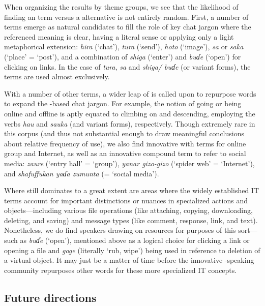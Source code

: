 \documentclass[output=paper
,newtxmath
,modfonts
,nonflat]{langsci/langscibook}
\begin{document}
When organizing the results by theme groups, we see that the likelihood of finding an  term versus a  alternative is not entirely random. First, a number of  terms emerge as natural candidates to fill the role of key chat jargon where the referenced meaning is clear, having a literal sense or applying only a light metaphorical extension: \textit{hira} (‘chat’), \textit{tura} (‘send’), \textit{hoto} (‘image’), \textit{sa} or \textit{saka} (‘place’ = ‘post’), and a combination of \textit{shiga} (‘enter’) and \textit{buɗe} (‘open’) for clicking on links. In the case of \textit{tura}, \textit{sa} and \textit{shiga/ buɗe} (or variant forms), the  terms are used almost exclusively. 

With a number of other terms, a wider leap of  is called upon to repurpose  words to expand the -based chat jargon. For example, the notion of going or being online and offline is aptly equated to climbing on and descending, employing the  verbs \textit{hau} and \textit{sauka} (and variant forms), respectively. Though extremely rare in this corpus (and thus not substantial enough to draw meaningful conclusions about relative frequency of use), we also find innovative  with terms for online group and Internet, as well as an innovative compound term to refer to social media: \textit{zaure} (‘entry hall’ = ‘group’), \textit{yanar gizo-gizo} (‘spider web’ = ‘Internet’), and \textit{shafuffukan yaɗa zumunta} (= ‘social media’).

Where  still dominates to a great extent are areas where the widely established  IT terms account for important distinctions or nuances in specialized actions and objects—including various file operations (like attaching, copying, downloading, deleting, and saving) and message types (like comment, response, link, and text). Nonetheless, we do find speakers drawing on  resources for purposes of this sort—such as \textit{buɗe} (‘open’), mentioned above as a logical choice for clicking a link or opening a file and \textit{goge} (literally ‘rub, wipe’) being used in reference to deletion of a virtual object. It may just be a matter of time before the innovative -speaking community repurposes other  words for these more specialized IT concepts.  

\subsection{Future directions}
\end{document}
